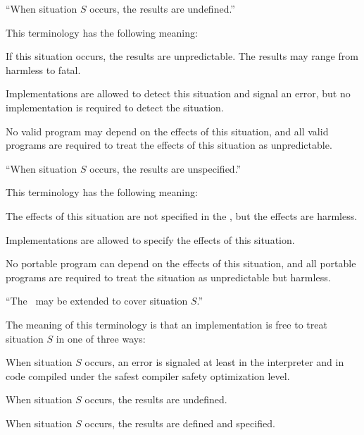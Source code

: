 ``When situation $S$ occurs, the results are undefined.''

This terminology has the following meaning:

\beginlist

\item{\bull} If this situation occurs, the results are unpredictable.  The
results may range from harmless to fatal.

\item{\bull} Implementations are allowed to detect this situation and
signal an error, but no implementation is required to detect the
situation.

\item{\bull} No valid program may depend on the effects of this
situation, and all valid programs are required to treat the effects 
of this situation as unpredictable.

\endlist

``When situation $S$ occurs, the results are unspecified.''

This terminology has the following meaning:

\beginlist

\item{\bull} The effects of this situation are not specified in
the \OS, but the effects are harmless.

\item{\bull} Implementations are allowed to specify the effects of
this situation.

\item{\bull} No portable program can depend on the effects of this
situation, and all portable programs are required to treat the situation
as unpredictable but harmless.

\endlist

``The \CLOS\ may be extended to cover situation $S$\negthinspace.''

The meaning of this terminology is that an implementation is free to treat
situation $S$ in one of three ways:

\beginlist

\item{\bull} When situation $S$ occurs, an error is signaled at least
in the interpreter and in code compiled under the safest compiler
safety optimization level.

\item{\bull} When situation $S$ occurs, the results are undefined.

\item{\bull} When situation $S$ occurs, the results are defined and
specified.

